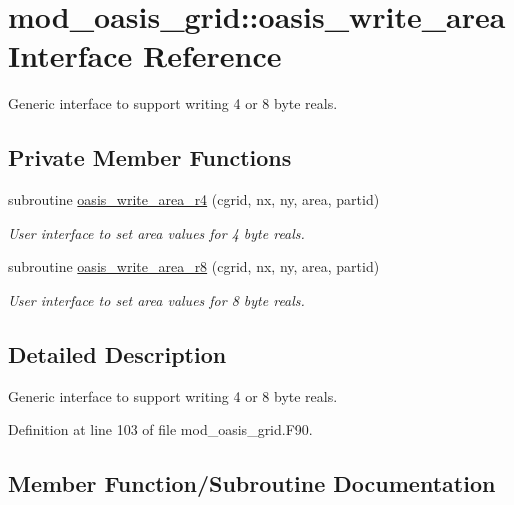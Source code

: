 \hypertarget{interfacemod__oasis__grid_1_1oasis__write__area}{}\section{mod\+\_\+oasis\+\_\+grid\+:\+:oasis\+\_\+write\+\_\+area Interface Reference}
\label{interfacemod__oasis__grid_1_1oasis__write__area}


Generic interface to support writing 4 or 8 byte reals.  


\subsection*{Private Member Functions}
\begin{DoxyCompactItemize}
\item 
subroutine \hyperlink{interfacemod__oasis__grid_1_1oasis__write__area_af355601b9ced09ab6bf152fada2d6d79}{oasis\+\_\+write\+\_\+area\+\_\+r4} (cgrid, nx, ny, area, partid)
\begin{DoxyCompactList}\small\item\em User interface to set area values for 4 byte reals. \end{DoxyCompactList}\item 
subroutine \hyperlink{interfacemod__oasis__grid_1_1oasis__write__area_a52b5ad6f028f6710ae4c17da1062dab4}{oasis\+\_\+write\+\_\+area\+\_\+r8} (cgrid, nx, ny, area, partid)
\begin{DoxyCompactList}\small\item\em User interface to set area values for 8 byte reals. \end{DoxyCompactList}\end{DoxyCompactItemize}


\subsection{Detailed Description}
Generic interface to support writing 4 or 8 byte reals. 

Definition at line 103 of file mod\+\_\+oasis\+\_\+grid.\+F90.



\subsection{Member Function/\+Subroutine Documentation}
\mbox{\label{interfacemod__oasis__grid_1_1oasis__write__area_af355601b9ced09ab6bf152fada2d6d79}} 
